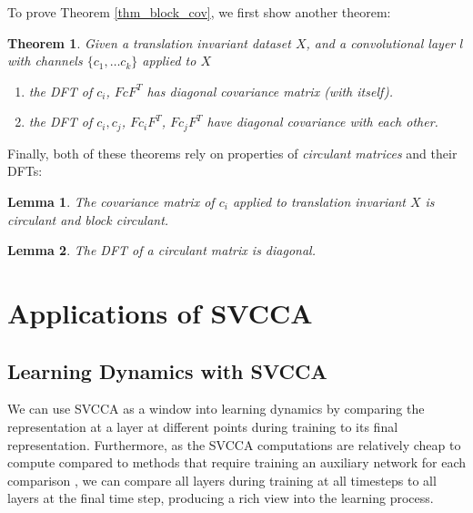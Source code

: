 \documentclass{article} %
\newtheorem{theorem}{Theorem}
\newtheorem{lemma}{Lemma}
\begin{document}
To prove Theorem \ref{thm_block_cov}, we first show another theorem:
\begin{theorem}
\label{thm_diag_cov}
Given a translation invariant dataset $X$, and a convolutional layer $l$ with channels $\{c_1, \dots c_k\}$ applied to $X$
\begin{enumerate}
  \vspace*{-.5em}
\item[(a)] the DFT of $c_i$, $FcF^T$ has diagonal covariance matrix (with itself).
  \vspace*{-.5em}
\item[(b)] the DFT of $c_i, c_j$, $Fc_iF^T$, $Fc_jF^T$ have diagonal covariance with each other.
  \vspace*{-.5em}
\end{enumerate}
\end{theorem}

Finally, both of these theorems rely on properties of \textit{circulant matrices} and their DFTs:
\begin{lemma}
\label{lemma_circulant}
The covariance matrix of $c_i$ applied to translation invariant $X$ is \textit{circulant} and \textit{block circulant}.
\end{lemma}
\begin{lemma}
\label{lemma_dft_diag}
The DFT of a circulant matrix is diagonal.
\end{lemma}


\section{Applications of SVCCA}

\subsection{Learning Dynamics with SVCCA}
\label{sec:dynamics}

We can use SVCCA as a window into learning dynamics by comparing
the representation at a layer at different points during training to its final representation.
Furthermore, as the SVCCA computations are relatively cheap to compute compared to methods that require training an auxiliary network for each comparison \cite{alain2016understanding,lenc2015understanding,li-2016-arXivICLR-convergent-learning:-do-different}, we can compare all layers during training at all timesteps to all layers at the final time step, producing a rich view into the learning process.
\end{document}
